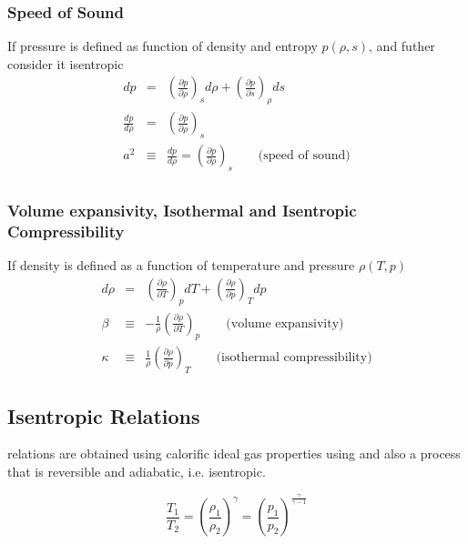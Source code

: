\subsubsection{Speed of Sound}
If pressure is defined as function of density and entropy $p(\rho,s)$, and futher consider it isentropic 
\begin{eqnarray}
   dp & = & \left( \frac{\partial p }{\partial \rho} \right)_s d\rho  + \left( \frac{\partial p }{\partial s} \right)_{\rho} ds\\
   \frac{dp}{d\rho} & = & \left( \frac{\partial p }{\partial \rho} \right)_s \\
   a^2 & \equiv & \frac{dp}{d\rho} = \left( \frac{\partial p }{\partial \rho} \right)_s \qquad \text{(speed of sound)} \\
\end{eqnarray}



\subsubsection{Volume expansivity, Isothermal and Isentropic Compressibility}
If density is defined as a function of temperature and pressure $\rho(T,p)$
\begin{eqnarray}
   d\rho & = & \left( \frac{\partial \rho }{\partial T} \right)_p dT  + \left( \frac{\partial \rho }{\partial p} \right)_{T} dp\\
   \beta & \equiv & - \frac{1}{\rho} \left( \frac{\partial \rho }{\partial T} \right)_p \qquad \text{(volume expansivity)}\\ 
   \kappa & \equiv &  \frac{1}{\rho} \left( \frac{\partial \rho }{\partial p} \right)_{T}  \qquad \text{(isothermal compressibility)} 
\end{eqnarray}





\subsection{Isentropic Relations}
relations are obtained using calorific ideal gas properties using and also a process that is reversible and adiabatic, i.e. isentropic.

\begin{equation}
\frac{T_1}{T_2}=\left(\frac{\rho_1}{\rho_2} \right)^\gamma=\left( \frac{p
_1}{p_2} \right)^\frac{\gamma}{\gamma-1}
\end{equation}







